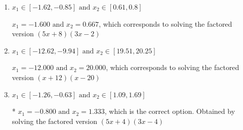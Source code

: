 \documentclass{extbook}[14pt]
\begin{document}
\begin{enumerate}
{\begin{enumerate}[label=\Alph*.]
$x_1 = -0.400 \text{ and } x_2 = 2.667$, which corresponds to solving the factored version $(5x + 2)(3x -8)$
\item \( x_1 \in [-1.62, -0.85] \text{ and } x_2 \in [0.61, 0.8] \)

$x_1 = -1.600 \text{ and } x_2 = 0.667$, which corresponds to solving the factored version $(5x + 8)(3x -2)$
\item \( x_1 \in [-12.62, -9.94] \text{ and } x_2 \in [19.51, 20.25] \)

$x_1 = -12.000 \text{ and } x_2 = 20.000$, which corresponds to solving the factored version $(x + 12)(x -20)$
\item \( x_1 \in [-1.26, -0.63] \text{ and } x_2 \in [1.09, 1.69] \)

* $x_1 = -0.800 \text{ and } x_2 = 1.333$, which is the correct option. Obtained by solving the factored version $(5x + 4)(3x -4)$
\end{enumerate}

}
\end{enumerate}
\end{document}
